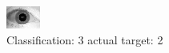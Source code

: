 \begin{figure}[h!]
\begin{center}
\includegraphics[width=0.60\columnwidth]{figures/ID1761_class_3_target_2.png}
\end{center}
\caption{ Classification: 3 actual target: 2}
\label{fig:ID1761_class_3_target_2}
\end{figure}
